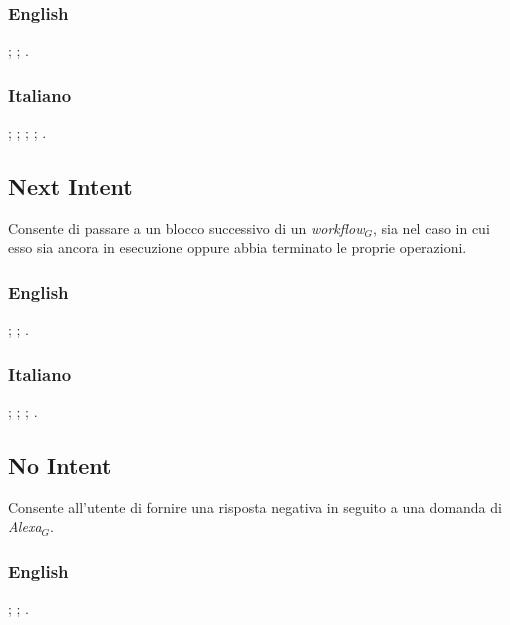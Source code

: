 \subsubsection{English}
\begin{itemize}	
	;
	;
	.
\end{itemize}

\subsubsection{Italiano}

\begin{itemize}
	;
	;
	;
	;
	.
\end{itemize}


\subsection{Next Intent}
Consente di passare a un blocco successivo di un \textit{workflow$_{G}$}, sia nel caso in cui esso sia ancora in esecuzione oppure abbia terminato le proprie operazioni. 
\subsubsection{English}
\begin{itemize}
	;
	;
	.	
\end{itemize}

\subsubsection{Italiano}

\begin{itemize}
	
	;
	;
	;
	.
	
\end{itemize}


\subsection{No Intent}
Consente all'utente di fornire una risposta negativa in seguito a una domanda di \textit{Alexa$_{G}$}.
\subsubsection{English}
\begin{itemize}
	
	;
	;
	.
	
\end{itemize}

